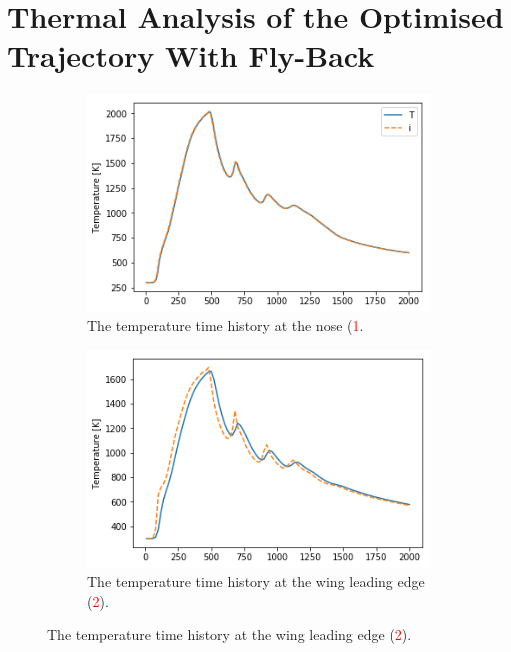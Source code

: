 \section{Thermal Analysis of the Optimised Trajectory With Fly-Back}
 

\begin{figure}[!ht]
	\begin{subfigure}{.5\textwidth}
		\centering
		\includegraphics[width=0.99\linewidth]{figures/A1_uncertainty-analysis/TNoseReturn}
		\caption{The temperature time history at the nose (\textcolor{red}{1}.}
		
	\end{subfigure}
	\begin{subfigure}{.5\textwidth}
		\centering
		\includegraphics[width=0.99\linewidth]{figures/A1_uncertainty-analysis/TLEReturn}
		\caption{The temperature time history at the wing leading edge (\textcolor{red}{2}).}
		

\end{subfigure}
\end{figure}
